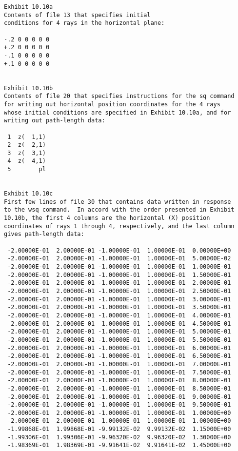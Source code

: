 \newpage
\begin{footnotesize}
\begin{verbatim}
Exhibit 10.10a
Contents of file 13 that specifies initial
conditions for 4 rays in the horizontal plane:

-.2 0 0 0 0 0
+.2 0 0 0 0 0
-.1 0 0 0 0 0
+.1 0 0 0 0 0


Exhibit 10.10b
Contents of file 20 that specifies instructions for the sq command
for writing out horizontal position coordinates for the 4 rays
whose initial conditions are specified in Exhibit 10.10a, and for
writing out path-length data:

 1  z(  1,1)
 2  z(  2,1)
 3  z(  3,1)
 4  z(  4,1)
 5        pl


Exhibit 10.10c
First few lines of file 30 that contains data written in response
to the wsq command.  In accord with the order presented in Exhibit
10.10b, the first 4 columns are the horizontal (X) position
coordinates of rays 1 through 4, respectively, and the last column
gives path-length data:

 -2.00000E-01  2.00000E-01 -1.00000E-01  1.00000E-01  0.00000E+00
 -2.00000E-01  2.00000E-01 -1.00000E-01  1.00000E-01  5.00000E-02
 -2.00000E-01  2.00000E-01 -1.00000E-01  1.00000E-01  1.00000E-01
 -2.00000E-01  2.00000E-01 -1.00000E-01  1.00000E-01  1.50000E-01
 -2.00000E-01  2.00000E-01 -1.00000E-01  1.00000E-01  2.00000E-01
 -2.00000E-01  2.00000E-01 -1.00000E-01  1.00000E-01  2.50000E-01
 -2.00000E-01  2.00000E-01 -1.00000E-01  1.00000E-01  3.00000E-01
 -2.00000E-01  2.00000E-01 -1.00000E-01  1.00000E-01  3.50000E-01
 -2.00000E-01  2.00000E-01 -1.00000E-01  1.00000E-01  4.00000E-01
 -2.00000E-01  2.00000E-01 -1.00000E-01  1.00000E-01  4.50000E-01
 -2.00000E-01  2.00000E-01 -1.00000E-01  1.00000E-01  5.00000E-01
 -2.00000E-01  2.00000E-01 -1.00000E-01  1.00000E-01  5.50000E-01
 -2.00000E-01  2.00000E-01 -1.00000E-01  1.00000E-01  6.00000E-01
 -2.00000E-01  2.00000E-01 -1.00000E-01  1.00000E-01  6.50000E-01
 -2.00000E-01  2.00000E-01 -1.00000E-01  1.00000E-01  7.00000E-01
 -2.00000E-01  2.00000E-01 -1.00000E-01  1.00000E-01  7.50000E-01
 -2.00000E-01  2.00000E-01 -1.00000E-01  1.00000E-01  8.00000E-01
 -2.00000E-01  2.00000E-01 -1.00000E-01  1.00000E-01  8.50000E-01
 -2.00000E-01  2.00000E-01 -1.00000E-01  1.00000E-01  9.00000E-01
 -2.00000E-01  2.00000E-01 -1.00000E-01  1.00000E-01  9.50000E-01
 -2.00000E-01  2.00000E-01 -1.00000E-01  1.00000E-01  1.00000E+00
 -2.00000E-01  2.00000E-01 -1.00000E-01  1.00000E-01  1.00000E+00
 -1.99868E-01  1.99868E-01 -9.99132E-02  9.99132E-02  1.15000E+00
 -1.99306E-01  1.99306E-01 -9.96320E-02  9.96320E-02  1.30000E+00
 -1.98369E-01  1.98369E-01 -9.91641E-02  9.91641E-02  1.45000E+00



\end{verbatim}
\end{footnotesize}
